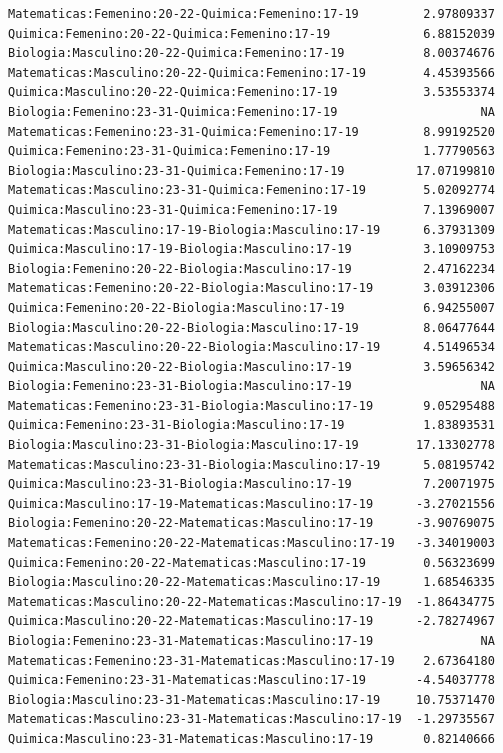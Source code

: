 \documentclass{rapport}
\begin{document}
\begin{itemize}
\begin{verbatim}
Matematicas:Femenino:20-22-Quimica:Femenino:17-19         2.97809337
Quimica:Femenino:20-22-Quimica:Femenino:17-19             6.88152039
Biologia:Masculino:20-22-Quimica:Femenino:17-19           8.00374676
Matematicas:Masculino:20-22-Quimica:Femenino:17-19        4.45393566
Quimica:Masculino:20-22-Quimica:Femenino:17-19            3.53553374
Biologia:Femenino:23-31-Quimica:Femenino:17-19                    NA
Matematicas:Femenino:23-31-Quimica:Femenino:17-19         8.99192520
Quimica:Femenino:23-31-Quimica:Femenino:17-19             1.77790563
Biologia:Masculino:23-31-Quimica:Femenino:17-19          17.07199810
Matematicas:Masculino:23-31-Quimica:Femenino:17-19        5.02092774
Quimica:Masculino:23-31-Quimica:Femenino:17-19            7.13969007
Matematicas:Masculino:17-19-Biologia:Masculino:17-19      6.37931309
Quimica:Masculino:17-19-Biologia:Masculino:17-19          3.10909753
Biologia:Femenino:20-22-Biologia:Masculino:17-19          2.47162234
Matematicas:Femenino:20-22-Biologia:Masculino:17-19       3.03912306
Quimica:Femenino:20-22-Biologia:Masculino:17-19           6.94255007
Biologia:Masculino:20-22-Biologia:Masculino:17-19         8.06477644
Matematicas:Masculino:20-22-Biologia:Masculino:17-19      4.51496534
Quimica:Masculino:20-22-Biologia:Masculino:17-19          3.59656342
Biologia:Femenino:23-31-Biologia:Masculino:17-19                  NA
Matematicas:Femenino:23-31-Biologia:Masculino:17-19       9.05295488
Quimica:Femenino:23-31-Biologia:Masculino:17-19           1.83893531
Biologia:Masculino:23-31-Biologia:Masculino:17-19        17.13302778
Matematicas:Masculino:23-31-Biologia:Masculino:17-19      5.08195742
Quimica:Masculino:23-31-Biologia:Masculino:17-19          7.20071975
Quimica:Masculino:17-19-Matematicas:Masculino:17-19      -3.27021556
Biologia:Femenino:20-22-Matematicas:Masculino:17-19      -3.90769075
Matematicas:Femenino:20-22-Matematicas:Masculino:17-19   -3.34019003
Quimica:Femenino:20-22-Matematicas:Masculino:17-19        0.56323699
Biologia:Masculino:20-22-Matematicas:Masculino:17-19      1.68546335
Matematicas:Masculino:20-22-Matematicas:Masculino:17-19  -1.86434775
Quimica:Masculino:20-22-Matematicas:Masculino:17-19      -2.78274967
Biologia:Femenino:23-31-Matematicas:Masculino:17-19               NA
Matematicas:Femenino:23-31-Matematicas:Masculino:17-19    2.67364180
Quimica:Femenino:23-31-Matematicas:Masculino:17-19       -4.54037778
Biologia:Masculino:23-31-Matematicas:Masculino:17-19     10.75371470
Matematicas:Masculino:23-31-Matematicas:Masculino:17-19  -1.29735567
Quimica:Masculino:23-31-Matematicas:Masculino:17-19       0.82140666

\end{verbatim}
\end{itemize}
\end{document}
